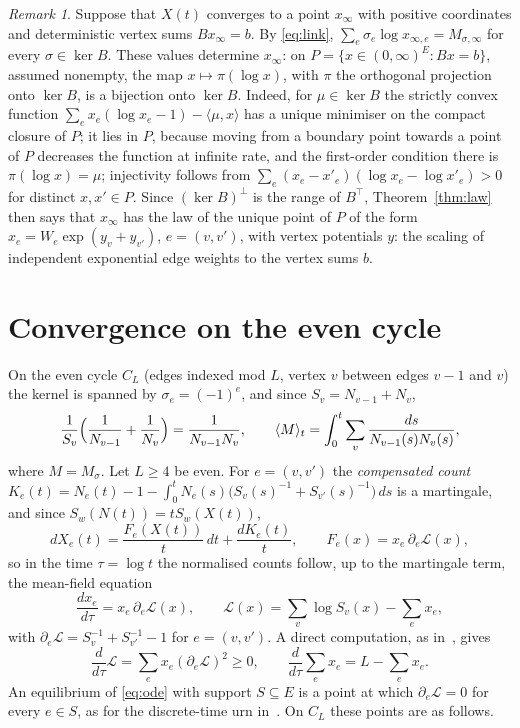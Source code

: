 \documentclass[11pt]{amsart}
\theoremstyle{remark}\newtheorem{remark}[theorem]{Remark}
\begin{document}
\begin{remark}\label{rem:fibre}
Suppose that $X(t)$ converges to a point $x_\infty$ with positive coordinates and deterministic vertex sums
$Bx_\infty=b$. By \eqref{eq:link}, $\sum_e\sigma_e\log x_{\infty,e}=M_{\sigma,\infty}$ for every $\sigma\in\ker B$. These
values determine $x_\infty$: on $P=\{x\in(0,\infty)^E:Bx=b\}$, assumed nonempty, the map $x\mapsto\pi(\log x)$, with $\pi$
the orthogonal projection onto $\ker B$, is a bijection onto $\ker B$. Indeed, for $\mu\in\ker B$ the strictly convex
function $\sum_ex_e(\log x_e-1)-\langle \mu,x\rangle$ has a unique minimiser on the compact closure of $P$; it lies in $P$,
because moving from a boundary point towards a point of $P$ decreases the function at infinite rate, and the first-order
condition there is $\pi(\log x)=\mu$; injectivity follows from $\sum_e(x_e-x'_e)(\log x_e-\log x'_e)>0$ for distinct
$x,x'\in P$. Since $(\ker B)^\perp$ is the range of $B^{\top}$, Theorem~\ref{thm:law} then says that $x_\infty$ has the
law of the unique point of $P$ of the form $x_e=W_e\exp(y_v+y_{v'})$, $e=(v,v')$, with vertex potentials $y$: the scaling of
independent exponential edge weights to the vertex sums $b$.
\end{remark}

\section{Convergence on the even cycle}\label{sec:cycle}
On the even cycle $C_L$ (edges indexed mod $L$, vertex $v$ between edges $v-1$ and $v$) the kernel is spanned by
$\sigma_e=(-1)^e$, and since $S_v=N_{v-1}+N_v$,
\[ \frac{1}{S_v}\Bigl(\frac1{N_{v-1}}+\frac1{N_v}\Bigr)=\frac{1}{N_{v-1}N_v},\qquad
   \langle M\rangle_t=\int_0^t\sum_{v}\frac{ds}{N_{v-1}(s)N_v(s)} ,\]
where $M=M_\sigma$. Let $L\ge4$ be even. For $e=(v,v')$ the \emph{compensated count}
$K_e(t)=N_e(t)-1-\int_0^tN_e(s)\bigl(S_v(s)^{-1}+S_{v'}(s)^{-1}\bigr)\,ds$ is a martingale, and since $S_w(N(t))=tS_w(X(t))$,
\[ dX_e(t)=\frac{F_e(X(t))}{t}\,dt+\frac{dK_e(t)}{t},\qquad F_e(x)=x_e\,\partial_e\mathcal{L}(x), \]
so in the time $\tau=\log t$ the normalised counts follow, up to the martingale term, the mean-field equation
\begin{equation}\label{eq:ode}
\frac{dx_e}{d\tau}=x_e\,\partial_e\mathcal{L}(x),\qquad
\mathcal{L}(x)=\sum_{v}\log S_v(x)-\sum_e x_e,
\end{equation}
with $\partial_e\mathcal{L}=S_v^{-1}+S_{v'}^{-1}-1$ for $e=(v,v')$. A direct computation, as in~\cite[Lemma~A.3]{HHKR}, gives
\[ \frac{d}{d\tau}\mathcal{L}=\sum_e x_e(\partial_e\mathcal{L})^2\ge0,\qquad \frac{d}{d\tau}\sum_e x_e=L-\sum_e x_e. \]
An equilibrium of \eqref{eq:ode} with support $S\subseteq E$ is a point at which $\partial_e\mathcal{L}=0$ for every
$e\in S$, as for the discrete-time urn in~\cite[Lemma~4.3]{BBCL}. On $C_L$ these points are as follows.
\end{document}
